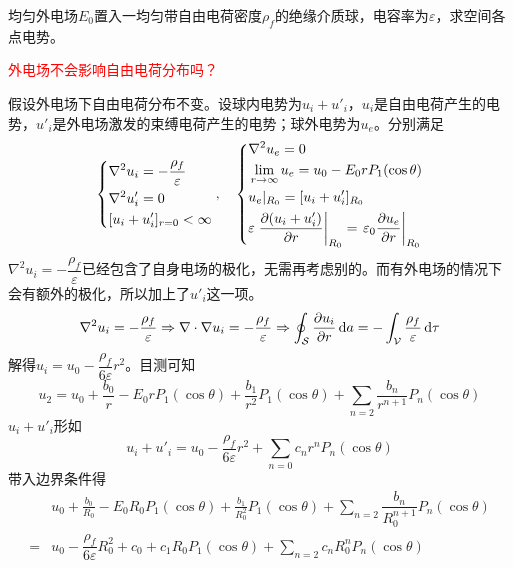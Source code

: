 \documentclass{mynote}
\begin{document}
\begin{exercise}{2.6}
    均匀外电场$E_0$置入一均匀带自由电荷密度$\rho_f$的绝缘介质球，电容率为$\varepsilon$，求空间各点电势。
\end{exercise}
\textcolor{red}{外电场不会影响自由电荷分布吗？}
\begin{solution}
    假设外电场下自由电荷分布不变。设球内电势为$u_i + u'_i$，$u_i$是自由电荷产生的电势，$u'_i$是外电场激发的束缚电荷产生的电势；球外电势为$u_e$。分别满足
    \[
    \left\{
        \begin{aligned}
            & \nabla^2 u_i = -\dfrac{\rho_f}{\varepsilon} \\
            & \nabla^2 u'_i = 0 \\
            & [u_i + u'_i]_{r=0} < \infty
        \end{aligned} 
    \right. 
    ,\quad 
    \left\{
        \begin{aligned}
            & \nabla^2 u_e = 0 \\
            & \lim_{r \to \infty} u_e = u_0 - E_0 r P_1(\cos \theta) \\
            & u_e|_{R_0} = [u_i + u'_i ]_{R_0} \\
            & \varepsilon \left. \dfrac{\partial (u_i + u'_i)}{\partial r} \right|_{R_0}= \left. \varepsilon_0 \dfrac{\partial u_e}{\partial r} \right|_{R_0}
        \end{aligned} 
    \right.
    \]
    $\nabla^2 u_i = -\dfrac{\rho_f}{\varepsilon}$已经包含了自身电场的极化，无需再考虑别的。而有外电场的情况下会有额外的极化，所以加上了$u'_i$这一项。
    \[
        \nabla^2 u_i = -\dfrac{\rho_f}{\varepsilon} \Rightarrow \nabla \cdot \nabla u_i = - \dfrac{\rho_f}{\varepsilon} \Rightarrow \oint_{\mathcal{S}} \dfrac{\partial u_i}{\partial r} \mathop{}\!\mathrm{d} a = -\int_{\mathcal{V}} \dfrac{\rho_f}{\varepsilon} \mathop{}\!\mathrm{d} \tau    
    \]
    解得$u_i = u_0 - \dfrac{\rho_f}{6\varepsilon} r^2$。目测可知
    \[
        u_2 = u_0 + \frac{b_0}{r} - E_0rP_1(\cos \theta) + \frac{b_1}{r^2}P_1(\cos \theta) + \sum_{n=2} \dfrac{b_n}{r^{n+1}} P_n(\cos \theta)
    \] 
    $u_i + u'_i$形如
    \[
        u_i + u'_i = u_0 - \dfrac{\rho_f}{6\varepsilon} r^2 + \sum_{n=0} c_n r^n P_n(\cos \theta)
    \]
    带入边界条件得
    \begin{align*}
        & u_0 + \frac{b_0}{R_0} - E_0 R_0 P_1(\cos \theta) + \frac{b_1}{R_0^2}P_1(\cos \theta) + \sum_{n=2} \dfrac{b_n}{R_0^{n+1}}  P_n(\cos \theta) \\
        =& u_0 - \dfrac{\rho_f}{6\varepsilon} R_0^2 + c_0 + c_1R_0P_1(\cos \theta) + \sum_{n=2} c_n R_0^n P_n(\cos \theta)
    \end{align*}

\end{solution}
\end{document}
